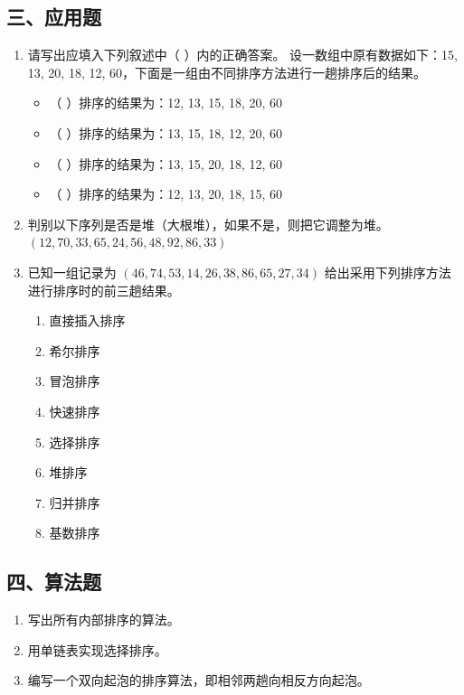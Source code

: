 \documentclass[12pt, a4paper]{article}
\begin{document}
\subsection*{三、应用题}
\begin{enumerate}
    \item 请写出应填入下列叙述中（ ）内的正确答案。
    设一数组中原有数据如下：15, 13, 20, 18, 12, 60，下面是一组由不同排序方法进行一趟排序后的结果。
    \begin{itemize}
        \item （ ）排序的结果为：12, 13, 15, 18, 20, 60
        \item （ ）排序的结果为：13, 15, 18, 12, 20, 60
        \item （ ）排序的结果为：13, 15, 20, 18, 12, 60
        \item （ ）排序的结果为：12, 13, 20, 18, 15, 60
    \end{itemize}
    
    \item 判别以下序列是否是堆（大根堆），如果不是，则把它调整为堆。
    $(12, 70, 33, 65, 24, 56, 48, 92, 86, 33)$
    
    \item 已知一组记录为 $(46, 74, 53, 14, 26, 38, 86, 65, 27, 34)$ 给出采用下列排序方法进行排序时的前三趟结果。
    \begin{enumerate}
        \item 直接插入排序
        \item 希尔排序
        \item 冒泡排序
        \item 快速排序
        \item 选择排序
        \item 堆排序
        \item 归并排序
        \item 基数排序
    \end{enumerate}
\end{enumerate}

\subsection*{四、算法题}
\begin{enumerate}
    \item 写出所有内部排序的算法。
    \item 用单链表实现选择排序。
    \item 编写一个双向起泡的排序算法，即相邻两趟向相反方向起泡。
\end{enumerate}
\end{document}

